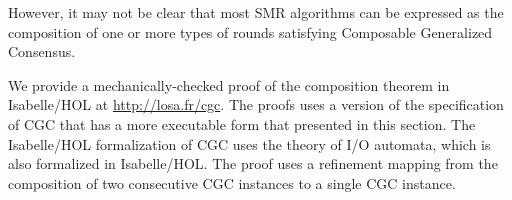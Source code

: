 However, it may not be clear that most SMR algorithms can be expressed as the composition of one or more types of rounds satisfying Composable Generalized Consensus.

We provide a mechanically-checked proof of the composition theorem in Isabelle/HOL at \url{http://losa.fr/cgc}.
The proofs uses a version of the specification of CGC that has a more
executable form that presented in this section. 
The Isabelle/HOL formalization of CGC uses the theory of I/O automata, which
is also formalized in Isabelle/HOL. The proof uses a refinement
mapping from the composition of two consecutive CGC instances to a single CGC
instance.

\begin{comment}
\begin{thm}[Composition Theorem]
    \label{thm:comp}
    In every execution of a succession of CGC instances, the history of valuations
    of the variable $proposed$ and, for every learner $l$, of the variables
    $learned\left[ l \right]$ satisfies Generalized Consensus.
\end{thm}
\Cref{thm:comp} can be shown by induction on the number of rounds,
using the following lemma.
\begin{lem}
  \label{lem:comp}
    Consider two rounds numbered $i$ and $i+1$. In every execution of a
    succession of CGC instances, the history of valuations of the variables $inits
    = inits_i$, $propose = proposed_i \cup propose_{i+1}$, for every learner
    $l$, $learned\left[ l \right] = learned_i\left[ l \right] \cup
    learned_{i+1}\left[ l \right]$and $aborts = aborts_{i+1}$ satisfies CGC.
\end{lem}
\begin{proof}
  A mechanically-checked proof in Isabelle/HOL appears in \cref{sec:isaproofs}.
  The proofs uses a version of the specification of CGC that has a more
  executable form that presented in this section. Moreover,
  instead of history of commands, the Isabelle/HOL specification uses the more
  general notion of command history, presented in the next subsection.
  The Isabelle/HOL formalization of CGC uses the theory of I/O automata, which
  is also formalized in the Isabelle/HOL. The proof uses a refinement
  mapping from the composition of two consecutive CGC instances to a single CGC
  instance.
\end{proof}

\Cref{thm:comp} guarantees that the successive composition of any
number of CGC instances implements Generalized Consensus.
Therefore, with CGC, one can easily build replicated services that
dynamically adapt to the current operating conditions of the system: a
replicated service has several types of rounds at its disposal, each being
tailored to particular conditions. Each time the conditions change,
the current CGC instance aborts and passes the baton to a more 
appropriate type of round, as determined by the scheduling policy. Moreover, a new type
of CGC instance can always be devised after the system is deployed and added on the fly to
the existing types of rounds.


\end{comment}

